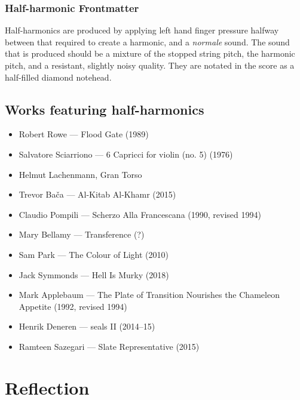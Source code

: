 \subsubsection{Half-harmonic Frontmatter}\label{sec:halfHarmonicFrontmatter}
Half-harmonics are produced by applying left hand finger pressure halfway between that required to create a harmonic, and a \emph{normale} sound. 
The sound that is produced should be a mixture of the stopped string pitch, the harmonic pitch, and a resistant, slightly noisy quality.
They are notated in the score as a half-filled diamond notehead.
\subsection{Works featuring half-harmonics}\label{sec:half-harmonicsLiterature}

\begin{itemize}
    \item Robert Rowe --- Flood Gate (1989)
    \item Salvatore Sciarriono --- 6 Capricci for violin (no. 5) (1976) 
    \item Helmut Lachenmann, Gran Torso
    \item Trevor Bača --- Al-Kitab Al-Khamr (2015)
    \item Claudio Pompili --- Scherzo Alla Francescana (1990, revised 1994)
    \item Mary Bellamy --- Transference (?)
    \item Sam Park --- The Colour of Light (2010)
    \item Jack Symmonds --- Hell Is Murky (2018)
    \item Mark Applebaum --- The Plate of Transition Nourishes the Chameleon Appetite (1992, revised 1994)
    \item Henrik Deneren --- seals II (2014--15)
    \item Ramteen Sazegari --- Slate Representative (2015)
\end{itemize}

\section{Reflection}




\lipsum[4]